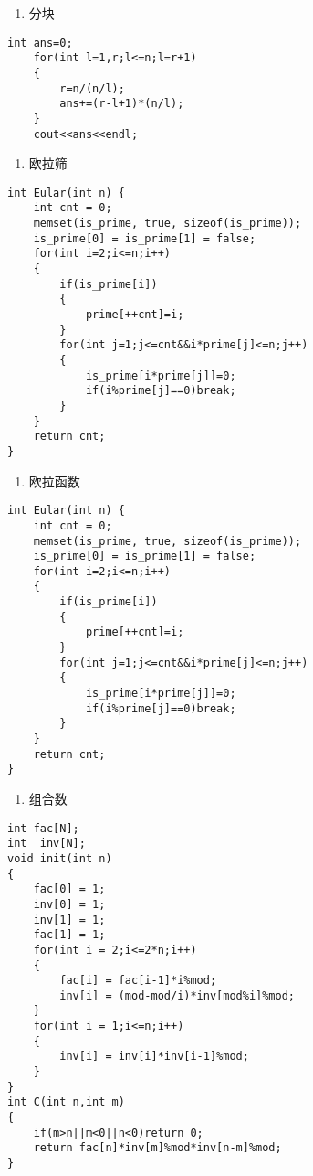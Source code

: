 \documentclass[]{article}
\providecommand{\tightlist}{%
  \setlength{\itemsep}{0pt}\setlength{\parskip}{0pt}}
\begin{document}
\begin{enumerate}
\def\labelenumi{\arabic{enumi}.}
\setcounter{enumi}{3}
\tightlist
\item
  分块
\end{enumerate}

\begin{verbatim}
int ans=0;
    for(int l=1,r;l<=n;l=r+1)
    {
        r=n/(n/l);
        ans+=(r-l+1)*(n/l);
    }
    cout<<ans<<endl;
\end{verbatim}

\begin{enumerate}
\def\labelenumi{\arabic{enumi}.}
\setcounter{enumi}{4}
\tightlist
\item
  欧拉筛
\end{enumerate}

\begin{verbatim}
int Eular(int n) {
    int cnt = 0;
    memset(is_prime, true, sizeof(is_prime));
    is_prime[0] = is_prime[1] = false;
    for(int i=2;i<=n;i++)
    {
        if(is_prime[i])
        {
            prime[++cnt]=i;
        }
        for(int j=1;j<=cnt&&i*prime[j]<=n;j++)
        {
            is_prime[i*prime[j]]=0;
            if(i%prime[j]==0)break;
        }
    }
    return cnt;
}
\end{verbatim}

\begin{enumerate}
\def\labelenumi{\arabic{enumi}.}
\setcounter{enumi}{5}
\tightlist
\item
  欧拉函数
\end{enumerate}

\begin{verbatim}
int Eular(int n) {
    int cnt = 0;
    memset(is_prime, true, sizeof(is_prime));
    is_prime[0] = is_prime[1] = false;
    for(int i=2;i<=n;i++)
    {
        if(is_prime[i])
        {
            prime[++cnt]=i;
        }
        for(int j=1;j<=cnt&&i*prime[j]<=n;j++)
        {
            is_prime[i*prime[j]]=0;
            if(i%prime[j]==0)break;
        }
    }
    return cnt;
}
\end{verbatim}

\begin{enumerate}
\def\labelenumi{\arabic{enumi}.}
\setcounter{enumi}{6}
\tightlist
\item
  组合数
\end{enumerate}

\begin{verbatim}
int fac[N];
int  inv[N];
void init(int n)
{
    fac[0] = 1;
    inv[0] = 1;
    inv[1] = 1;
    fac[1] = 1;
    for(int i = 2;i<=2*n;i++)
    {
        fac[i] = fac[i-1]*i%mod;
        inv[i] = (mod-mod/i)*inv[mod%i]%mod;
    }
    for(int i = 1;i<=n;i++)
    {
        inv[i] = inv[i]*inv[i-1]%mod;
    }
}
int C(int n,int m)
{
    if(m>n||m<0||n<0)return 0;
    return fac[n]*inv[m]%mod*inv[n-m]%mod;
}
\end{verbatim}
\end{document}
